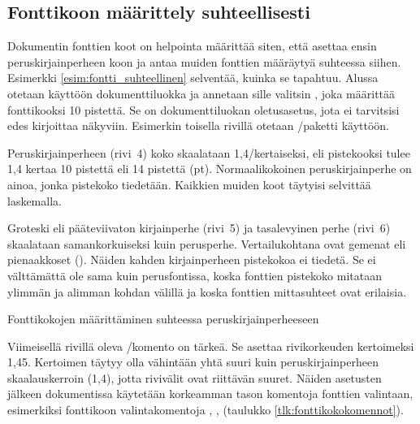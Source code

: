 
\subsection{Fonttikoon määrittely suhteellisesti}
\label{luku:fontti_suhteellinen}

Dokumentin fonttien koot on helpointa määrittää siten, että asettaa
ensin peruskirjainperheen koon ja antaa muiden fonttien määräytyä
suhteessa siihen. Esimerkki \ref{esim:fontti_suhteellinen} selventää,
kuinka se tapahtuu. Alussa otetaan käyttöön dokumenttiluokka
 ja annetaan sille valitsin \koodi{10pt}, joka määrittää
fonttikooksi 10 pistettä. Se on dokumenttiluokan ole\-tus\-ase\-tus,
jota ei tarvitsisi edes kirjoittaa näkyviin. Esimerkin toisella rivillä
otetaan \-/paketti käyttöön.

Peruskirjainperheen (rivi~4) koko skaalataan 1,4\-/kertaiseksi, eli
pistekooksi tulee 1,4 kertaa 10 pistettä eli 14 pistettä (pt).
Normaalikokoinen peruskirjainperhe on ainoa, jonka pistekoko tiedetään.
Kaikkien muiden koot täytyisi selvittää laskemalla.

Groteski eli pääteviivaton kirjainperhe (rivi~5) ja tasalevyinen perhe
(rivi~6) skaalataan samankorkuiseksi kuin perusperhe. Vertailukohtana
ovat gemenat eli pienaakkoset (). Näiden kahden
kirjainperheen pistekokoa ei tiedetä. Se ei välttämättä ole sama kuin
perusfontissa, koska fonttien pistekoko mitataan ylimmän ja alimman
kohdan välillä ja koska fonttien mittasuhteet ovat erilaisia.

\begin{esimerkki*}
\caption{Fonttikokojen määrittäminen suhteessa peruskirjainperheeseen}
\label{esim:fontti_suhteellinen}
\end{esimerkki*}

Viimeisellä rivillä oleva \-/komento on tärkeä.
Se asettaa rivikorkeuden kertoimeksi 1,45. Kertoimen täytyy olla
vähintään yhtä suuri kuin peruskirjainperheen skaalauskerroin (1,4),
jotta rivivälit ovat riittävän suuret. Näiden asetusten jälkeen
dokumentissa käytetään korkeamman tason komentoja fonttien valintaan,
esimerkiksi fonttikoon valintakomentoja ,
,  (taulukko
\ref{tlk:fonttikokokomennot}).

